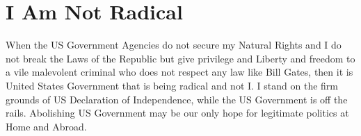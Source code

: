 \documentclass{amsart}
\begin{document}
\section{I Am Not Radical}

When the US Government Agencies do not secure my Natural Rights and I do not break the Laws of the Republic but give privilege and Liberty and freedom to a vile malevolent criminal who does not respect any law like Bill Gates, then it is United States Government that is being radical and not I.  I stand on the firm grounds of US Declaration of Independence, while the US Government is off the rails.  Abolishing US Government may be our only hope for legitimate politics at Home and Abroad.
\end{document}
